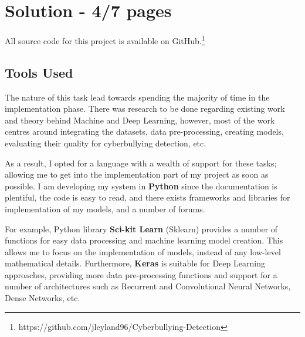 \documentclass[12pt,a4paper]{article}
\begin{document}
\section{Solution - 4/7 pages}

All source code for this project is available on GitHub.\footnote{https://github.com/jleyland96/Cyberbullying-Detection}

\subsection{Tools Used}
The nature of this task lead towards spending the majority of time in the implementation phase. There was research to be done regarding existing work and theory behind Machine and Deep Learning, however, most of the work centres around integrating the datasets, data pre-processing, creating models, evaluating their quality for cyberbullying detection, etc. 

As a result, I opted for a language with a wealth of support for these tasks; allowing me to get into the implementation part of my project as soon as possible. I am developing my system in \textbf{Python} since the documentation is plentiful, the code is easy to read, and there exists frameworks and libraries for implementation of my models, and a number of forums. 

For example, Python library \textbf{Sci-kit Learn} (Sklearn) provides a number of functions for easy data processing and machine learning model creation. This allows me to focus on the implementation of models, instead of any low-level mathematical details. Furthermore, \textbf{Keras} is suitable for Deep Learning approaches, providing more data pre-processing functions and support for a number of architectures such as Recurrent and Convolutional Neural Networks, Dense Networks, etc. 
\end{document}
